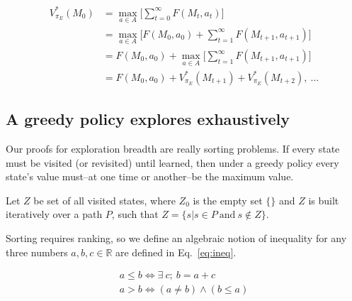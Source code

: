 \documentclass[10pt,letterpaper]{article}
\begin{document}
\begin{equation} \label{eq:bellman_seq}
    \begin{split}
        V^*_{\pi_E}(M_0) &= \max_{a \in A} \Big [\sum_{t=0}^{\infty} F(M_t, a_t)\Big ]\\
                         &= \max_{a \in A} \Big [F(M_0, a_0) + \sum^{\infty}_{t=1} F(M_{t+1}, a_{t+1})\Big ]\\
                         &= F(M_0, a_0) + \max_{a \in A} \Big [\sum_{t=1}^{\infty} F(M_{t+1}, a_{t+1}) \Big ]\\
                         &= F(M_0, a_0) + V^*_{\pi_E}(M_{t+1}) + V^*_{\pi_E}(M_{t+2}),\ \ldots
    \end{split}
\end{equation}

\subsection*{A greedy policy explores exhaustively}
Our proofs for exploration breadth are really sorting problems. If every state must be visited (or revisited) until learned, then under a greedy policy every state's value must--at one time or another--be the maximum value. 

Let $Z$ be set of all visited states, where $Z_0$ is the empty set $\{\}$ and $Z$ is built iteratively over a path $P$, such that $Z = \{s | s \in P\ \text{and}\ s \not\in Z\}$.    

Sorting requires ranking, so we define an algebraic notion of inequality for any three numbers ${a,b,c} \in \mathbb{R}$ are defined in Eq.~\ref{eq:ineq}.

\begin{align}
    \label{eq:ineq}
    a \leq b \Leftrightarrow \exists \ c;\ b = a + c \\
    a > b \Leftrightarrow (a \neq b) \wedge (b \leq a) 
\end{align}
\end{document}
